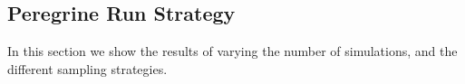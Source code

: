 \subsection{Peregrine Run Strategy}

In this section we show the results of varying the number of simulations, and the different sampling strategies.


% 


